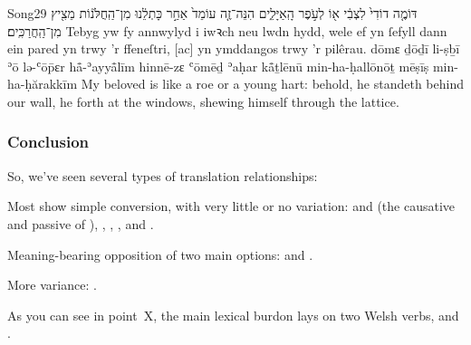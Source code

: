 




\tounfold{***}

\begin{example}{Song}{2}{9}{}{}
	\quoling
	{דּוֹמֶ֤ה דוֹדִי֙ לִצְבִ֔י א֖וֹ לְעֹ֣פֶר הָֽאַיָּלִ֑ים הִנֵּה־זֶ֤ה עוֹמֵד֙ אַחַ֣ר כָּתְלֵ֔נוּ  מִן־הַֽחֲלֹּנ֔וֹת מֵצִ֖יץ מִן־הַֽחֲרַכִּֽים׃}
	{Tebyg yw fy annwylyd i iwꝛch neu lwdn hydd, wele ef yn ſefyll dann ein pared yn  trwy ’r ffeneſtri, [ac] yn ymddangos trwy ’r pilêrau.}
	{dōmɛ ḏōḏī li-ṣḇī ʾō lə-ʿōp̄ɛr hå̄-ʾayyå̄līm hinnē-zɛ ʿōmēḏ ʾaḥar kå̄ṯlēnū  min-ha-ḥallōnōṯ mēṣīṣ min-ha-ḥărakkīm}
	{My beloved is like a roe or a young hart: behold, he standeth behind our wall, he  forth at the windows, shewing himself through the lattice.}
\end{example}



\begin{paper}
	\subsubsection{Conclusion}

	{\click} So, we’ve seen several types of translation relationships:
	\begin{compactitem}
		\item Most show simple conversion, with very little or no variation:
			 and  (the causative and passive of ), , , ,  and .
		\item Meaning-bearing opposition of two main options:
			 and .
		\item More variance:
			.
	\end{compactitem}

	As you can see in point~X, the main lexical burdon lays on two Welsh verbs,  and .
\end{paper}
